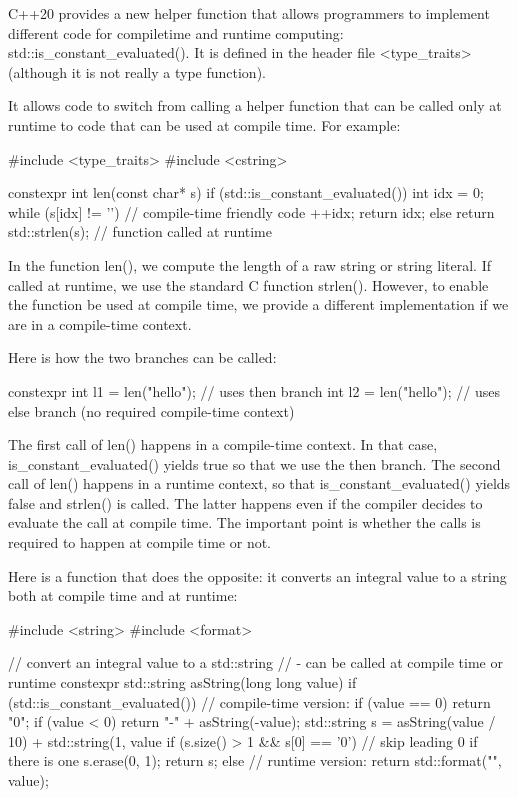 
C++20 provides a new helper function that allows programmers to implement different code for compiletime and runtime computing: std::is\_constant\_evaluated(). It is defined in the header file <type\_traits> (although it is not really a type function).

It allows code to switch from calling a helper function that can be called only at runtime to code that can be used at compile time. For example:


\begin{cpp}
#include <type_traits>
#include <cstring>

constexpr int len(const char* s)
{
	if (std::is_constant_evaluated()) {
		int idx = 0;
		while (s[idx] != '\0') { // compile-time friendly code
			++idx;
		}
		return idx;
	}
	else {
		return std::strlen(s); // function called at runtime
	}
}
\end{cpp}

In the function len(), we compute the length of a raw string or string literal. If called at runtime, we use the standard C function strlen(). However, to enable the function be used at compile time, we provide a different implementation if we are in a compile-time context.

Here is how the two branches can be called:

\begin{cpp}
constexpr int l1 = len("hello"); // uses then branch
int l2 = len("hello"); // uses else branch (no required compile-time context)
\end{cpp}

The first call of len() happens in a compile-time context. In that case, is\_constant\_evaluated() yields true so that we use the then branch. The second call of len() happens in a runtime context, so that is\_constant\_evaluated() yields false and strlen() is called. The latter happens even if the compiler decides to evaluate the call at compile time. The important point is whether the calls is required to happen at compile time or not.

Here is a function that does the opposite: it converts an integral value to a string both at compile time and at runtime:


\begin{cpp}
#include <string>
#include <format>

// convert an integral value to a std::string
// - can be called at compile time or runtime
constexpr std::string asString(long long value)
{
	if (std::is_constant_evaluated()) {
		// compile-time version:
		if (value == 0) {
			return "0";
		}
		if (value < 0) {
			return "-" + asString(-value);
		}
		std::string s = asString(value / 10) + std::string(1, value %
		if (s.size() > 1 && s[0] == '0') { // skip leading 0 if there is one
			s.erase(0, 1);
		}
		return s;
	}
	else {
		// runtime version:
		return std::format("{}", value);
	}
}
\end{cpp}

